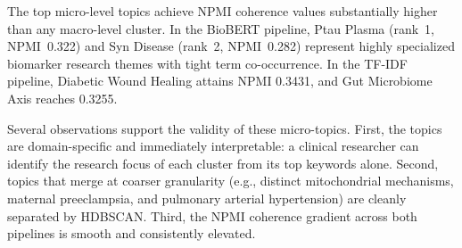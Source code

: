 \documentclass[a4paper,fleqn]{cas-dc}
\begin{document}
\begin{table}[t]
\centering
\caption{Top-10 HDBSCAN micro-topics from sparse TF-IDF ranked by NPMI coherence.}
\label{tab:micro_tfidf}
\end{table}

The top micro-level topics achieve NPMI coherence values substantially higher than any macro-level cluster. In the BioBERT pipeline, Ptau Plasma (rank~1, NPMI~0.322) and Syn Disease (rank~2, NPMI~0.282) represent highly specialized biomarker research themes with tight term co-occurrence. In the TF-IDF pipeline, Diabetic Wound Healing attains NPMI 0.3431, and Gut Microbiome Axis reaches 0.3255.

Several observations support the validity of these micro-topics. First, the topics are domain-specific and immediately interpretable: a clinical researcher can identify the research focus of each cluster from its top keywords alone. Second, topics that merge at coarser granularity (e.g., distinct mitochondrial mechanisms, maternal preeclampsia, and pulmonary arterial hypertension) are cleanly separated by HDBSCAN. Third, the NPMI coherence gradient across both pipelines is smooth and consistently elevated.
\end{document}

